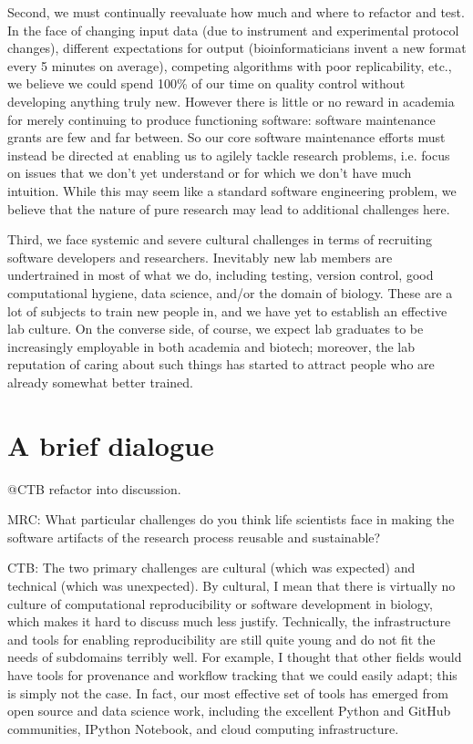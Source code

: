 \documentclass[11pt]{article}
\begin{document}
Second, we must continually reevaluate how much and where to refactor
and test.  In the face of changing input data (due to instrument and
experimental protocol changes), different expectations for output
(bioinformaticians invent a new format every 5 minutes on average),
competing algorithms with poor replicability, etc., we believe we
could spend 100\% of our time on quality control without developing
anything truly new.  However there is little or no reward in academia
for merely continuing to produce functioning software: software
maintenance grants are few and far between.  So our core software
maintenance efforts must instead be directed at enabling us to agilely
tackle research problems, i.e. focus on issues that we don't yet
understand or for which we don't have much intuition.  While this may
seem like a standard software engineering problem, we believe that
the nature of pure research may lead to additional challenges here.

Third, we face systemic and severe cultural challenges in terms of
recruiting software developers and researchers.  Inevitably new lab
members are undertrained in most of what we do, including testing,
version control, good computational hygiene, data science, and/or the
domain of biology.  These are a lot of subjects to train new people
in, and we have yet to establish an effective lab culture.  On the
converse side, of course, we expect lab graduates to be increasingly
employable in both academia and biotech; moreover, the lab reputation
of caring about such things has started to attract people who are
already somewhat better trained.

\section{A brief dialogue}

@CTB refactor into discussion.

MRC: What particular challenges do you think life scientists face in
making the software artifacts of the research process reusable and
sustainable?

CTB: The two primary challenges are cultural (which was expected) and
technical (which was unexpected).  By cultural, I mean that there is
virtually no culture of computational reproducibility or software
development in biology, which makes it hard to discuss much less
justify.  Technically, the infrastructure and tools for enabling
reproducibility are still quite young and do not fit the needs of
subdomains terribly well.  For example, I thought that other fields
would have tools for provenance and workflow tracking that we could
easily adapt; this is simply not the case.  In fact, our most effective set
of tools has emerged from open source and data science work, including
the excellent Python and GitHub communities, IPython Notebook, and
cloud computing infrastructure.
\end{document}
